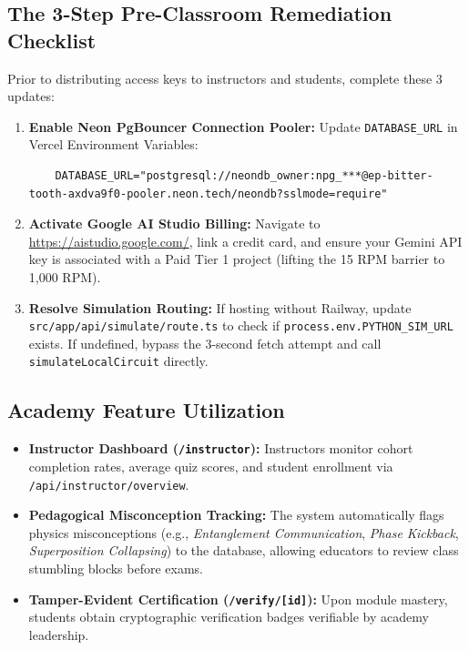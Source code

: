 \documentclass[11pt, a4paper]{article}
\begin{document}
\subsection{The 3-Step Pre-Classroom Remediation Checklist}
Prior to distributing access keys to instructors and students, complete these 3 updates:

\begin{enumerate}[leftmargin=1.5em]
    \item \textbf{Enable Neon PgBouncer Connection Pooler:}
    Update \texttt{DATABASE\_URL} in Vercel Environment Variables:
    \begin{lstlisting}
    DATABASE_URL="postgresql://neondb_owner:npg_***@ep-bitter-tooth-axdva9f0-pooler.neon.tech/neondb?sslmode=require"
    \end{lstlisting}
    
    \item \textbf{Activate Google AI Studio Billing:}
    Navigate to \url{https://aistudio.google.com/}, link a credit card, and ensure your Gemini API key is associated with a Paid Tier 1 project (lifting the 15 RPM barrier to 1,000 RPM).

    \item \textbf{Resolve Simulation Routing:}
    If hosting without Railway, update \texttt{src/app/api/simulate/route.ts} to check if \texttt{process.env.PYTHON\_SIM\_URL} exists. If undefined, bypass the 3-second fetch attempt and call \texttt{simulateLocalCircuit} directly.
\end{enumerate}

\subsection{Academy Feature Utilization}
\begin{itemize}[leftmargin=1.5em]
    \item \textbf{Instructor Dashboard (\texttt{/instructor}):} Instructors monitor cohort completion rates, average quiz scores, and student enrollment via \texttt{/api/instructor/overview}.
    \item \textbf{Pedagogical Misconception Tracking:} The system automatically flags physics misconceptions (e.g., \textit{Entanglement Communication}, \textit{Phase Kickback}, \textit{Superposition Collapsing}) to the database, allowing educators to review class stumbling blocks before exams.
    \item \textbf{Tamper-Evident Certification (\texttt{/verify/[id]}):} Upon module mastery, students obtain cryptographic verification badges verifiable by academy leadership.
\end{itemize}
\end{document}
